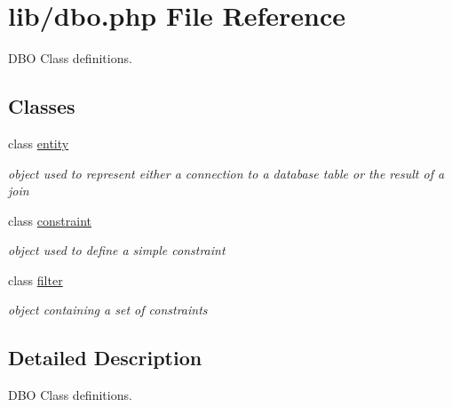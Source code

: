 \hypertarget{dbo_8php}{}\section{lib/dbo.php File Reference}
\label{dbo_8php}


D\+B\+O Class definitions.  


\subsection*{Classes}
\begin{DoxyCompactItemize}
\item 
class \hyperlink{classentity}{entity}
\begin{DoxyCompactList}\small\item\em object used to represent either a connection to a database table or the result of a join \end{DoxyCompactList}\item 
class \hyperlink{classconstraint}{constraint}
\begin{DoxyCompactList}\small\item\em object used to define a simple constraint \end{DoxyCompactList}\item 
class \hyperlink{classfilter}{filter}
\begin{DoxyCompactList}\small\item\em object containing a set of constraints \end{DoxyCompactList}\end{DoxyCompactItemize}


\subsection{Detailed Description}
D\+B\+O Class definitions. 

